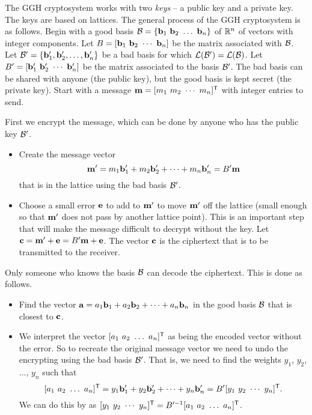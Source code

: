 The GGH cryptosystem works with two \emph{keys} -- a public key and a private key. The keys are based on lattices. The general process of the GGH cryptosystem is as follows. Begin with a good basis $\mathcal{B} = \{\mathbf{b}_1 \ \mathbf{b}_2 \ \ldots \ \mathbf{b}_n\}$ of $\mathbb{R}^n$ of vectors with integer components. Let $B = [\vb_1 \ \vb_2 \ \cdots \ \vb_n]$ be the matrix associated with $\mathcal{B}$. Let $\mathcal{B}' = \{\mathbf{b}'_1, \mathbf{b}'_2, \ldots, \mathbf{b}'_n\}$ be a bad basis for which $\mathcal{L}(\mathcal{B}') = \mathcal{L}(\mathcal{B})$. Let $B' = [\vb'_1 \ \vb'_2 \ \cdots \ \vb'_n]$ be the matrix associated to the basis $\mathcal{B}'$. The bad basis can be shared with anyone (the public key), but the good basis is kept secret (the private key). Start with a message $\vm = [m_1 \ m_2 \ \cdots \ m_n]^{\tr}$ with integer entries to send. 

First we encrypt the message, which can be done by anyone who has the public key $\mathcal{B}'$.
\begin{itemize}
\item Create the message vector 
\[\mathbf{m}' = m_1 \mathbf{b}'_1 +  m_2 \mathbf{b}'_2 + \cdots +  m_n \mathbf{b}'_n = B' \mathbf{m}\]
that is in the lattice using the bad basis $\mathcal{B}'$.
\item Choose a small error $\mathbf{e}$ to add to $\mathbf{m}'$ to move $\mathbf{m}'$ off the lattice (small enough so that $\mathbf{m}'$ does not pass by another lattice point). This is an important step that will make the message difficult to decrypt without the key. Let $\mathbf{c} = \mathbf{m}' + \mathbf{e} = B'\mathbf{m} + \mathbf{e}$. The vector $\mathbf{c}$ is the ciphertext that is to be transmitted to the receiver.
\end{itemize}

Only someone who knows the basis $\mathcal{B}$ can decode the ciphertext. This is done as follows.
\begin{itemize}
\item Find the vector $\mathbf{a} = a_1 \mathbf{b}_1 + a_2 \mathbf{b}_2 + \cdots + a_n \mathbf{b}_n$ in the good basis $\mathcal{B}$ that is closest to $\mathbf{c}$. 
\item We interpret the vector $[a_1 \ a_2 \ \ldots \ a_n]^{\tr}$ as being the encoded vector without the error. So to recreate the original message vector we need to undo the encrypting using the bad basis $\mathcal{B}'$. That is, we need to find the weights $y_1$, $y_2$, $\ldots$, $y_n$ such that 
\[[a_1 \ a_2 \ \ldots \ a_n]^{\mathsf{T}} = y_1 \mathbf{b}'_1 + y_2 \mathbf{b}'_2 + \cdots + y_n \mathbf{b}'_n = B' [y_1 \ y_2 \ \cdots \ y_n]^{\mathsf{T}}.\]
We can do this by as $[y_1 \ y_2 \ \cdots \ y_n]^{\tr} = B'^{-1} [a_1 \ a_2 \ \ldots \ a_n]^{\tr}$.
\end{itemize}

